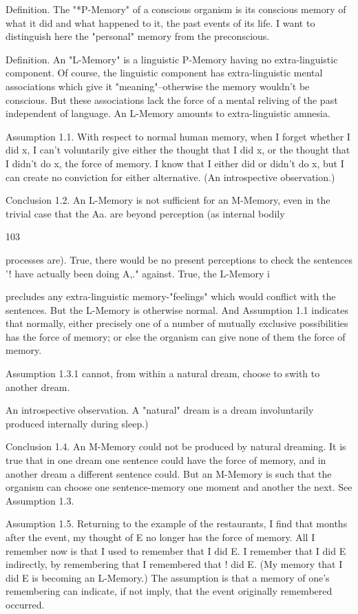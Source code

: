 \documentclass[10pt,twoside]{memoir}
\begin{document}
\begin{enumerate}
{{{{{{{{{{{{{{{{{{Definition. The "*P-Memory" of a conscious organism is its conscious 
memory of what it did and what happened to it, the past events of its life. I 
want to distinguish here the "personal" memory from the preconscious. 

Definition. An "L-Memory" is a linguistic P-Memory having no 
extra-linguistic component. Of course, the linguistic component has 
extra-linguistic mental associations which give it "meaning"--otherwise the 
memory wouldn't be conscious. But these associations lack the force of a 
mental reliving of the past independent of language. An L-Memory amounts 
to extra-linguistic amnesia. 

Assumption 1.1. With respect to normal human memory, when I forget 
whether I did x, I can't voluntarily give either the thought that I did x, or 
the thought that I didn't do x, the force of memory. I know that I either did 
or didn't do x, but I can create no conviction for either alternative. (An 
introspective observation.) 

Conclusion 1.2. An L-Memory is not sufficient for an M-Memory, even 
in the trivial case that the Aa. are beyond perception (as internal bodily 


103 


processes are). True, there would be no present perceptions to check the 
sentences '! have actually been doing A,." against. True, the L-Memory 
i 


precludes any extra-linguistic memory-"feelings" which would conflict with 
the sentences. But the L-Memory is otherwise normal. And Assumption 1.1 
indicates that normally, either precisely one of a number of mutually 
exclusive possibilities has the force of memory; or else the organism can give 
none of them the force of memory. 

Assumption 1.3.1 cannot, from within a natural dream, choose to swith 
to another dream. {An introspective observation. A "natural" dream is a 
dream involuntarily produced internally during sleep.) 

Conclusion 1.4. An M-Memory could not be produced by natural 
dreaming. It is true that in one dream one sentence could have the force of 
memory, and in another dream a different sentence could. But an M-Memory 
is such that the organism can choose one sentence-memory one moment and 
another the next. See Assumption 1.3. 

Assumption 1.5. Returning to the example of the restaurants, I find 
that months after the event, my thought of E no longer has the force of 
memory. All I remember now is that I used to remember that I did E. I 
remember that I did E indirectly, by remembering that I remembered that ! 
did E. (My memory that I did E is becoming an L-Memory.) The assumption 
is that a memory of one's remembering can indicate, if not imply, that the 
event originally remembered occurred. 

}}}}}}}}}}}}}}}}}}}
\end{enumerate}
\end{document}
